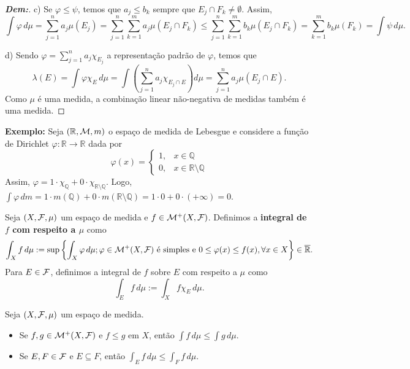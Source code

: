 \begin{proof}[\textbf{Dem:}]
\noindent
c) Se $\varphi \le \psi$, temos que $a_j \le b_k$ sempre que $E_j \cap F_k \neq \emptyset$. Assim,
$$ \int \varphi \, d\mu = \sum_{j=1}^n a_j \mu(E_j) = \sum_{j=1}^n \sum_{k=1}^m a_j \mu(E_j \cap F_k) \le \sum_{j=1}^n \sum_{k=1}^m b_k \mu(E_j \cap F_k) = \sum_{k=1}^m b_k \mu(F_k) = \int \psi \, d\mu. $$

\noindent
d) Sendo $\varphi = \sum_{j=1}^n a_j \chi_{E_j}$ a representação padrão de $\varphi$, temos que
$$ \lambda(E) = \int \varphi \chi_E \, d\mu = \int \left( \sum_{j=1}^n a_j \chi_{E_j \cap E} \right) d\mu = \sum_{j=1}^n a_j \mu(E_j \cap E). $$
Como $\mu$ é uma medida, a combinação linear não-negativa de medidas também é uma medida.
\end{proof}

\textbf{Exemplo:} Seja $(\mathbb{R}, \mathcal{M}, m)$ o espaço de medida de Lebesgue e considere a função de Dirichlet $\varphi: \mathbb{R} \rightarrow \mathbb{R}$ dada por
$$ \varphi(x) = \begin{cases} 
1, & x \in \mathbb{Q} \\ 
0, & x \in \mathbb{R} \setminus \mathbb{Q} 
\end{cases} $$
Assim, $\varphi = 1 \cdot \chi_{\mathbb{Q}} + 0 \cdot \chi_{\mathbb{R} \setminus \mathbb{Q}}$.
Logo, $\int \varphi \, dm = 1 \cdot m(\mathbb{Q}) + 0 \cdot m(\mathbb{R} \setminus \mathbb{Q}) = 1 \cdot 0 + 0 \cdot (+\infty) = 0$.

\begin{definition*}{}
Seja $(X, \mathcal{F}, \mu)$ um espaço de medida e $f \in \mathcal{M}^+(X, \mathcal{F})$. Definimos a \textbf{integral de $f$ com respeito a $\mu$} como
$$ \int_X f \, d\mu := \sup \left\{ \int_X \varphi \, d\mu ; \varphi \in \mathcal{M}^+(X, \mathcal{F}) \text{ é simples e } 0 \le \varphi(x) \le f(x), \forall x \in X \right\} \in \overline{\mathbb{R}}. $$
Para $E \in \mathcal{F}$, definimos a integral de $f$ sobre $E$ com respeito a $\mu$ como
$$ \int_E f \, d\mu := \int_X f \chi_E \, d\mu. $$
\end{definition*}

\begin{prop*}{}
Seja $(X, \mathcal{F}, \mu)$ um espaço de medida.
\begin{itemize}
    \item[a)] Se $f, g \in \mathcal{M}^+(X, \mathcal{F})$ e $f \le g$ em $X$, então $\int f \, d\mu \le \int g \, d\mu$.
    \item[b)] Se $E, F \in \mathcal{F}$ e $E \subseteq F$, então $\int_E f \, d\mu \le \int_F f \, d\mu$.
\end{itemize}
\end{prop*}

